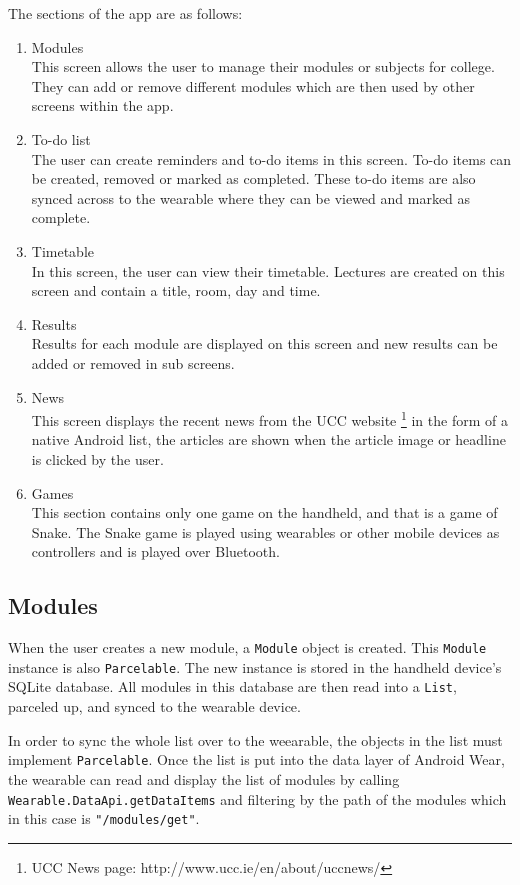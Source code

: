 The sections of the app are as follows:
\begin{enumerate}
\item Modules\\
    This screen allows the user to manage their modules or subjects for
    college. They can add or remove different modules which are then used by
    other screens within the app.
\item To-do list\\
    The user can create reminders and to-do items in this screen. To-do items
    can be created, removed or marked as completed. These to-do items are also
    synced across to the wearable where they can be viewed and marked as
    complete.
\item Timetable\\
    In this screen, the user can view their timetable. Lectures are created on
    this screen and contain a title, room, day and time.
\item Results\\
    Results for each module are displayed on this screen and new results can be
    added or removed in sub screens.
\item News\\
    This screen displays the recent news from the UCC website
    \footnote{UCC News page: http://www.ucc.ie/en/about/uccnews/} in the form
    of a native Android list, the articles are shown when the article image or
    headline is clicked by the user.
\item Games\\
    This section contains only one game on the handheld, and that is a game of
    Snake. The Snake game is played using wearables or other mobile devices as
    controllers and is played over Bluetooth.
\end{enumerate}

\subsection{Modules}
When the user creates a new module, a \texttt{Module} object is created. This
\texttt{Module} instance is also \texttt{Parcelable}. The new instance is stored
in the handheld device's SQLite database. All modules in this database are then
read into a \texttt{List}, parceled up, and synced to the wearable device.

In order to sync the whole list over to the weearable, the objects in the list
must implement \texttt{Parcelable}. Once the list is put into the data layer of
Android Wear, the wearable can read and display the list of modules by calling
\texttt{Wearable.DataApi.getDataItems} and filtering by the path of the modules
which in this case is \texttt{"/modules/get"}.

